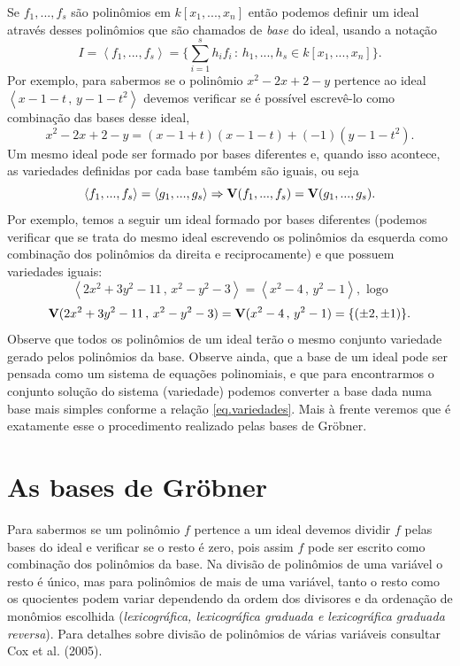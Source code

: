 \documentclass[a4paper,12pt,oneside,onecolumn,final,fleqn]{repUERJ}
\begin{document}
Se $f_1,...,f_s$ são polinômios em $k[x_1,...,x_n]$ então podemos definir um ideal através desses polinômios que são chamados de {\it base} do ideal, usando a notação
\begin{equation*}
I=\left\langle f_1,...,f_s \right\rangle = \{\sum_{i=1}^s h_if_i\,:\,h_1,...,h_s \in k[x_1,...,x_n]\}.
\end{equation*}
Por exemplo, para sabermos se o polinômio $x^2-2x+2-y$ pertence ao ideal $\left\langle x-1-t\,,\,y-1-t^2 \right\rangle$ devemos verificar se é possível escrevê-lo como combinação das bases desse ideal, 
\begin{equation*}
x^2-2x+2-y=(x-1+t)(x-1-t)+(-1)(y-1-t^2).
\end{equation*}
Um mesmo ideal pode ser formado por bases diferentes e, quando isso acontece, as variedades definidas por cada base também são iguais, ou seja
\begin{equation*}
\left\langle f_1,...,f_s \right\rangle = \left\langle g_1,...,g_s \right\rangle \Rightarrow {\bf V}(f_1,...,f_s)={\bf V}(g_1,...,g_s).
\end{equation*}
Por exemplo, temos a seguir um ideal formado por bases diferentes (podemos verificar que se trata do mesmo ideal escrevendo os polinômios da esquerda como combinação dos polinômios da direita e reciprocamente) e que possuem variedades iguais:
\begin{equation*}
\left\langle 2x^2+3y^2-11\,,\,x^2-y^2-3 \right\rangle = \left\langle x^2-4\,,\,y^2-1 \right\rangle,\,\, \text{logo}
\end{equation*}
\begin{equation}\label{eq.variedades}
{\bf V}(2x^2+3y^2-11\,,\,x^2-y^2-3)={\bf V}(x^2-4\,,\,y^2-1)=\{(\pm2,\pm1)\}.
\end{equation}
Observe que todos os polinômios de um ideal terão o mesmo conjunto variedade gerado pelos polinômios da base. Observe ainda, que a base de um ideal pode ser pensada como um sistema de equações polinomiais, e que para encontrarmos o conjunto solução do sistema (variedade) podemos converter a base dada numa base mais simples conforme a relação \ref{eq.variedades}. Mais à frente veremos que é exatamente esse o procedimento realizado pelas bases de Gr\"obner.

\section{As bases de Gr\"obner}

Para sabermos se um polinômio $f$ pertence a um ideal devemos dividir $f$ pelas bases do ideal e verificar se o resto é zero, pois assim $f$ pode ser escrito como combinação dos polinômios da base. Na divisão de polinômios de uma variável o resto é único, mas para polinômios de mais de uma variável, tanto o resto como os quocientes podem variar dependendo da ordem dos divisores e da ordenação de monômios escolhida ({\it lexicográfica, lexicográfica graduada e lexicográfica graduada reversa}). Para detalhes sobre divisão de polinômios de várias variáveis consultar Cox et al. (2005). 
\end{document}

